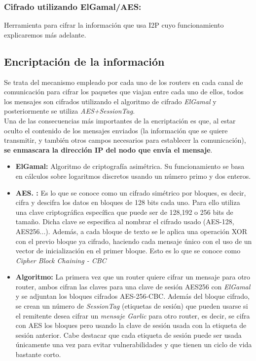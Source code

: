 \subsubsection*{Cifrado utilizando ElGamal/AES:}
Herramienta para cifrar la información que usa I2P cuyo funcionamiento explicaremos más adelante.




\subsection{Encriptación de la información}

Se trata del mecanismo empleado por cada uno de los routers en cada canal de comunicación para cifrar los paquetes que viajan entre cada uno de ellos, todos los mensajes son cifrados utilizando el algoritmo de cifrado \textit{ElGamal} y posteriormente se utiliza \textit{AES+SessionTag}.\\

Una de las consecuencias más importantes de la encriptación es que, al estar oculto el contenido de los mensajes enviados (la información que se quiere transmitir, y también otros campos necesarios para establecer la comunicación), \textbf{se enmascara la dirección IP del nodo que envía el mensaje}.


\begin{itemize}

\item \textbf{ElGamal:}
Algoritmo de criptografía asimétrica. Su funcionamiento se basa en cálculos sobre logaritmos discretos usando un número primo y dos enteros.   


\item \textbf{AES. :}
Es lo que se conoce como un cifrado simétrico por bloques, es decir, cifra y descifra los datos en bloques de 128 bits cada uno. Para ello utiliza una clave criptográfica específica que puede ser de 128,192 o 256 bits de tamaño. Dicha clave se especifica al nombrar el cifrado usado (AES-128, AES256...). Además, a cada bloque de texto se le aplica una operación XOR con el previo bloque ya cifrado, haciendo cada mensaje único con el uso de un vector de inicialización en el primer bloque. Esto es lo que se conoce como \textit{Cipher Block Chaining - CBC} 


\item \textbf{Algoritmo:} La primera vez que un router quiere cifrar un mensaje para otro router, ambos cifran las claves para una clave de sesión AES256 con \textit{ElGamal} y se adjuntan los bloques cifrados  AES-256-CBC.
Además del bloque cifrado, se crean un número de \textit{SessionTag} (etiquetas de sesión) que pueden usarse si el remitente desea cifrar un \textit{mensaje Garlic} para otro router, es decir, se cifra con AES los bloques pero usando la clave de sesión usada con la etiqueta de sesión anterior. 
Cabe destacar que cada etiqueta de sesión puede ser usada únicamente una vez para evitar vulnerabilidades y que tienen un ciclo de vida bastante corto.


\end{itemize}




